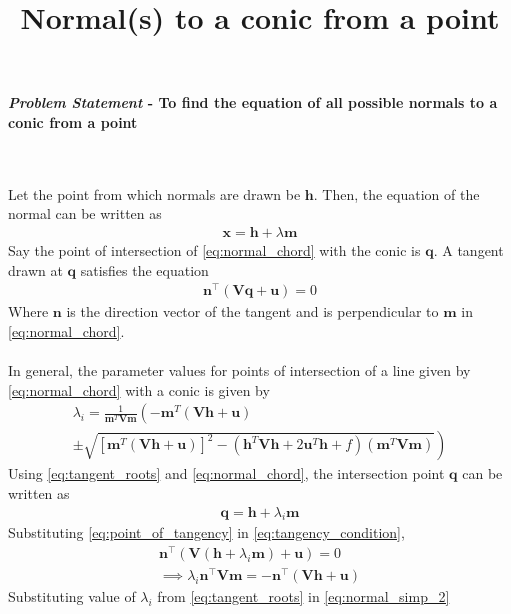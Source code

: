 \documentclass[journal,10pt,twocolumn]{article}
\title{\textbf{Normal(s) to a conic from a point}}
\let\vec\mathbf
\providecommand{\brak}[1]{\ensuremath{\left(#1\right)}}
\providecommand{\lbrak}[1]{\ensuremath{\left(#1\right.}}
\providecommand{\rbrak}[1]{\ensuremath{\left.#1\right)}}
\providecommand{\sbrak}[1]{\ensuremath{{}\left[#1\right]}}
\begin{document}
\maketitle
\paragraph{\textit{Problem Statement} - To find the equation of all possible normals to a conic from a point}\

Let the point from which normals are drawn be $\vec{h}$. Then, the equation of the normal can be written as
\begin{align}
	\vec{x} = \vec{h} + \lambda\vec{m}
	\label{eq:normal_chord}
\end{align}
Say the point of intersection of \eqref{eq:normal_chord} with the conic is $\vec{q}$. A tangent drawn at $\vec{q}$ satisfies the equation
\begin{align}
	\label{eq:tangency_condition}
	\vec{n}^\top(\vec{Vq}+\vec{u}) = 0
\end{align}
Where $\vec{n}$ is the direction vector of the tangent and is perpendicular to $\vec{m}$ in \eqref{eq:normal_chord}.\\\\
In general, the parameter values for points of intersection of a line given by \eqref{eq:normal_chord} with a conic is given by
{\tiny
\begin{multline}
\lambda_i = \frac{1}
{
\vec{m}^T\vec{V}\vec{m}
}
\lbrak{-\vec{m}^T\brak{\vec{V}\vec{h}+\vec{u}}}
\\
\pm
\rbrak{\sqrt{
\sbrak{
\vec{m}^T\brak{\vec{V}\vec{h}+\vec{u}}
}^2
-
\brak
{
\vec{h}^T\vec{V}\vec{h} + 2\vec{u}^T\vec{h} +f
}
\brak{\vec{m}^T\vec{V}\vec{m}}
}
}
\label{eq:tangent_roots}
\end{multline}
}
Using \eqref{eq:tangent_roots} and \eqref{eq:normal_chord}, the intersection point $\vec{q}$ can be written as
\begin{align}
	\label{eq:point_of_tangency}
	\vec{q} = \vec{h} + \lambda_i\vec{m}
\end{align}
Substituting \eqref{eq:point_of_tangency} in \eqref{eq:tangency_condition},
\begin{align}
	\label{eq:normal_simp_1}
	\vec{n}^\top(\vec{V}(\vec{h}+\lambda_i\vec{m})+\vec{u}) = 0\\
	\label{eq:normal_simp_2}
	\implies \lambda_i\vec{n}^\top\vec{V}\vec{m} = -\vec{n}^\top(\vec{Vh}+\vec{u})
\end{align}
Substituting value of $\lambda_i$ from \eqref{eq:tangent_roots} in \eqref{eq:normal_simp_2}
\end{document}
